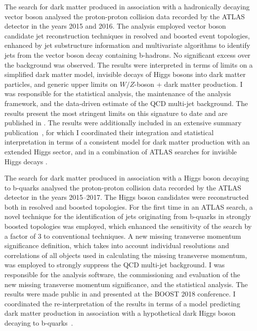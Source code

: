 \documentclass{article}
\begin{document}
The search for dark matter produced in association with a hadronically decaying vector boson analysed the proton-proton collision data recorded by the ATLAS detector in the years 2015 and 2016. The analysis employed vector boson candidate jet reconstruction techniques in resolved and boosted event topologies, enhanced by jet substructure information and multivariate algorithms to identify jets from the vector boson decay containing b-hadrons. No significant excess over the background was observed. The results were interpreted in terms of limits on a simplified dark matter model, invisible decays of Higgs bosons into dark matter particles, and generic upper limits on \(W/Z\)-boson + dark matter production. I was responsible for the statistical analysis, the maintenance of the analysis framework, and the data-driven estimate of the QCD multi-jet background. The results present the most stringent limits on this signature to date and are published in \cite{EXOT-2016-23}.
The results were additionally included in an extensive summary publication~\cite{EXOT-2017-32}, for which I coordinated their integration and statistical interpretation in terms of a consistent model for dark matter production with an extended Higgs sector, and in a combination of ATLAS searches for invisible Higgs decays \cite{HIGG-2018-54}.

\medskip

The search for dark matter produced in association with a Higgs boson decaying to b-quarks analysed the proton-proton collision data recorded by the ATLAS detector in the years 2015--2017. The Higgs boson candidates were reconstructed both in resolved and boosted topologies. For the first time in an ATLAS search, a novel technique for the identification of jets originating from b-quarks in strongly boosted topologies was employed, which enhanced the sensitivity of the search by a factor of 3 to conventional techniques. A new missing transverse momentum significance definition, which takes into account individual resolutions and correlations of all objects used in calculating the missing transverse momentum, was employed to strongly suppress the QCD multi-jet background. I was responsible for the analysis software, the commissioning and evaluation of the new missing transverse momentum significance, and the statistical analysis. The results were made public in \cite{ATLAS-CONF-2018-039} and presented at the BOOST 2018 conference. I coordinated the re-interpretation of the results in terms of a model predicting dark matter production in association with a hypothetical dark Higgs boson decaying to b-quarks~\cite{ATL-PHYS-PUB-2019-032}.
\end{document}
